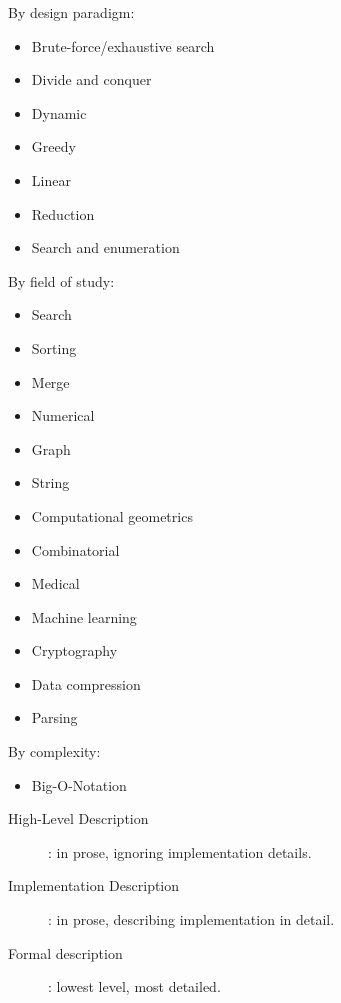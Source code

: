 By design paradigm:
\begin{itemize}
  \item Brute-force/exhaustive search
  \item Divide and conquer
  \item Dynamic
  \item Greedy
  \item Linear
  \item Reduction
  \item Search and enumeration
\end{itemize}

By field of study:
\begin{itemize}
  \item Search
  \item Sorting
  \item Merge
  \item Numerical
  \item Graph
  \item String
  \item Computational geometrics
  \item Combinatorial
  \item Medical
  \item Machine learning
  \item Cryptography
  \item Data compression
  \item Parsing
\end{itemize}

By complexity:
\begin{itemize}
  \item Big-O-Notation
\end{itemize}

\begin{description}
  \item [High-Level Description]: in prose, ignoring implementation details.
  \item [Implementation Description]: in prose, describing implementation in detail.
  \item [Formal description]: lowest level, most detailed.
\end{description}


